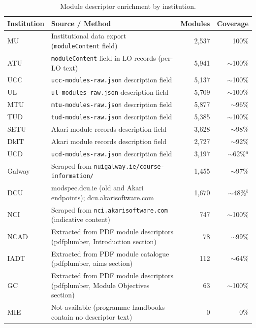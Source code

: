 \documentclass[12pt, a4paper]{article}
\begin{document}
\begin{table}[H]
\centering
\caption{Module descriptor enrichment by institution.}
\label{tab:descriptors}
\begin{tabular}{llrr}
\toprule
\textbf{Institution} & \textbf{Source / Method} & \textbf{Modules} & \textbf{Coverage} \\
\midrule
MU      & Institutional data export (\texttt{moduleContent} field) & 2,537 & 100\% \\
ATU     & \texttt{moduleContent} field in LO records (per-LO text) & 5,941 & $\sim$100\% \\
UCC     & \texttt{ucc-modules-raw.json} description field & 5,137 & $\sim$100\% \\
UL      & \texttt{ul-modules-raw.json} description field & 5,709 & $\sim$100\% \\
MTU     & \texttt{mtu-modules-raw.json} description field & 5,877 & $\sim$96\% \\
TUD     & \texttt{tud-modules-raw.json} description field & 5,385 & $\sim$100\% \\
SETU    & Akari module records description field & 3,628 & $\sim$98\% \\
DkIT    & Akari module records description field & 2,727 & $\sim$92\% \\
UCD     & \texttt{ucd-modules-raw.json} description field & 3,197 & $\sim$62\%$^a$ \\
Galway  & Scraped from \texttt{nuigalway.ie/course-information/} & 1,455 & $\sim$97\% \\
DCU     & modspec.dcu.ie (old and Akari endpoints); dcu.akarisoftware.com & 1,670 & $\sim$48\%$^b$ \\
NCI     & Scraped from \texttt{nci.akarisoftware.com} (indicative content) & 747 & $\sim$100\% \\
NCAD    & Extracted from PDF module descriptors (pdfplumber, Introduction section) & 78 & $\sim$99\% \\
IADT    & Extracted from PDF module catalogue (pdfplumber, aims section) & 112 & $\sim$64\% \\
GC      & Extracted from PDF module descriptors (pdfplumber, Module Objectives section) & 63 & $\sim$100\% \\
MIE     & Not available (programme handbooks contain no descriptor text) & 0 & 0\% \\
\bottomrule
\end{tabular}

\smallskip
{}
\end{table}
\end{document}
